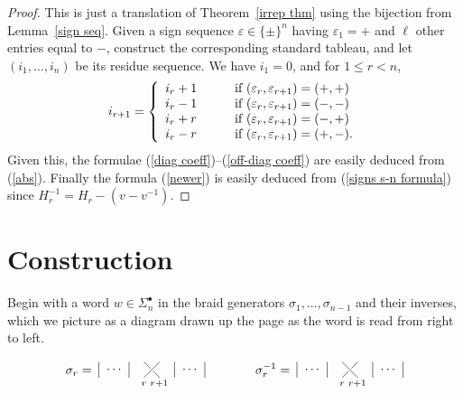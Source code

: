 \documentclass [12pt, letterpaper, oneside] {amsart}
\newcommand \e {\varepsilon}
\newcommand \s {\sigma}
\theoremstyle {plain}
\begin{document}
\begin{proof}
This is just a translation of Theorem~\ref{irrep thm}
using the bijection from Lemma~\ref{sign seq}.
Given a sign sequence
$\e \in \{\pm\}^n$
having $\e_1=+$ and $\ell$ other entries equal to $-$, 
construct the corresponding standard tableau, and let $(i_1,\dots,i_n)$ be its residue sequence.
We have $i_1 = 0$, and for $1 \le r < n$,
\begin {equation} \label {sign to cont}
i_{r+1} = \left\{ \begin {array} {l l}
i_r + 1 &\qquad \text {if } (\e_r, \e_{r+1}) = (+, +) \\
i_r - 1 &\qquad \text {if } (\e_r, \e_{r+1}) = (-, -) \\
i_r + r &\qquad \text {if } (\e_r, \e_{r+1}) = (-, +) \\
i_r - r &\qquad \text {if } (\e_r, \e_{r+1}) = (+, -).
\end {array} \right.
\end {equation}
Given this, the formulae  (\ref{diag coeff})--(\ref{off-diag coeff}) are easily deduced from (\ref{abs}).
Finally the formula (\ref{newer}) is easily deduced from (\ref{signs s-n formula})
since $H_r^{-1} = H_r - (v-v^{-1})$.
\end{proof}

\section {Construction} \label {sec constr}

Begin with a word $w \in \Sigma_n^\bullet$ in the braid generators $\s_1, \ldots, \s_{n-1}$ and their inverses, which we picture as a diagram drawn up the page as the word is read from right to left.  
\[
\s_r = \; \vcenter{
\xy 0;/r.10pc/:
(0,15)*{},
(0,0);(0,10)**@{-},
(10,5)*{\cdots},
(20,0);(20,10)**@{-},
(30,0);(40,10)**@{-},
(40,0);(36,4)**@{-},
(34,6);(30,10)**@{-},
(30,-4)*{_{\phantom{+1} r \phantom {+1}}},
(40,-4)*{_{r+1}},
(50,0);(50,10)**@{-},
(60,5)*{\cdots},
(70,0);(70,10)**@{-}
\endxy
} \qquad \qquad
\s_r^{-1} = \; \vcenter{
\xy 0;/r.10pc/:
(0,15)*{},
(0,0);(0,10)**@{-},
(10,5)*{\cdots},
(20,0);(20,10)**@{-},
(30,0);(34,4)**@{-},
(36,6);(40,10)**@{-},
(40,0);(30,10)**@{-},
(30,-4)*{_{\phantom{+1} r \phantom {+1}}},
(40,-4)*{_{r+1}},
(50,0);(50,10)**@{-},
(60,5)*{\cdots},
(70,0);(70,10)**@{-}
\endxy
}
\]
\end{document}
